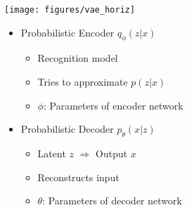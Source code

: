 \documentclass[11pt, a4paper, landscape]{article}
\begin{document}
\NewPage{}
\begin{center}
	\texttt{[image: figures/vae\_horiz]}\\
\end{center}
\vfill
\begin{minipage}[b]{.5\linewidth}
	\begin{itemize}
		\item Probabilistic Encoder $q_\phi(z|x)$
		\begin{itemize}
			\item Recognition model
			\item Tries to approximate $p(z|x)$
      \item $\phi$: Parameters of encoder network
		\end{itemize}
	\end{itemize}
\end{minipage}
\begin{minipage}[b]{.5\linewidth}
	\begin{center}
		\begin{itemize}
			\item Probabilistic Decoder $p_\theta(x|z)$
			\begin{itemize}
				\item Latent $z$ $\Rightarrow$ Output $x$
				\item Reconstructs input
        \item $\theta$: Parameters of decoder network
			\end{itemize}
		\end{itemize}
	\end{center}
\end{minipage}
\vfill
\end{document}
